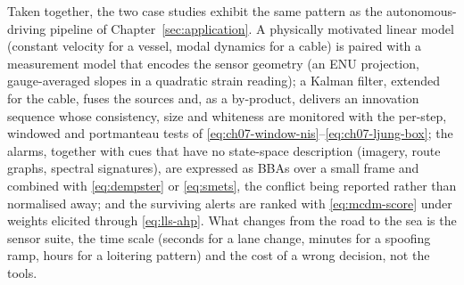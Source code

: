 Taken together, the two case studies exhibit the same pattern as the autonomous-driving pipeline of Chapter~\ref{sec:application}. A physically motivated linear model (constant velocity for a vessel, modal dynamics for a cable) is paired with a measurement model that encodes the sensor geometry (an ENU projection, gauge-averaged slopes in a quadratic strain reading); a Kalman filter, extended for the cable, fuses the sources and, as a by-product, delivers an innovation sequence whose consistency, size and whiteness are monitored with the per-step, windowed and portmanteau tests of \eqref{eq:ch07-window-nis}--\eqref{eq:ch07-ljung-box}; the alarms, together with cues that have no state-space description (imagery, route graphs, spectral signatures), are expressed as BBAs over a small frame and combined with \eqref{eq:dempster} or \eqref{eq:smets}, the conflict being reported rather than normalised away; and the surviving alerts are ranked with \eqref{eq:mcdm-score} under weights elicited through \eqref{eq:lls-ahp}. What changes from the road to the sea is the sensor suite, the time scale (seconds for a lane change, minutes for a spoofing ramp, hours for a loitering pattern) and the cost of a wrong decision, not the tools.


